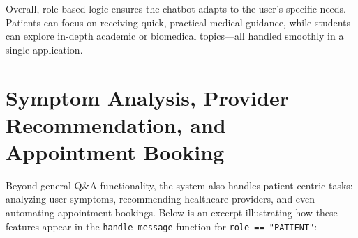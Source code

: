\noindent
Overall, role-based logic ensures the chatbot adapts to the user’s specific needs. Patients can focus on receiving quick, practical medical guidance, while students can explore in-depth academic or biomedical topics—all handled smoothly in a single application.

\section{Symptom Analysis, Provider Recommendation, and Appointment Booking}
\label{sec:provider-appointment}

Beyond general Q\&A functionality, the system also handles patient-centric tasks: analyzing user symptoms, 
recommending healthcare providers, and even automating appointment bookings. Below is an excerpt illustrating 
how these features appear in the \texttt{handle\_message} function for \texttt{role == "PATIENT"}:


